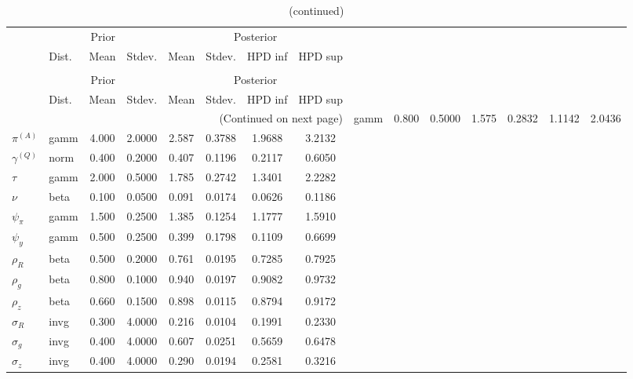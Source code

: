  
\begin{center}
\begin{longtable}{llcccccc} 
\caption{Results from Metropolis-Hastings (parameters)}
 \label{Table:MHPosterior:1}\\
\toprule 
  & \multicolumn{3}{c}{Prior}  &  \multicolumn{4}{c}{Posterior} \\
  \cmidrule(r{.75em}){2-4} \cmidrule(r{.75em}){5-8}
  & Dist. & Mean  & Stdev. & Mean & Stdev. & HPD inf & HPD sup\\
\midrule \endfirsthead 
\caption{(continued)}\\\toprule 
  & \multicolumn{3}{c}{Prior}  &  \multicolumn{4}{c}{Posterior} \\
  \cmidrule(r{.75em}){2-4} \cmidrule(r{.75em}){5-8}
  & Dist. & Mean  & Stdev. & Mean & Stdev. & HPD inf & HPD sup\\
\midrule \endhead 
\bottomrule \multicolumn{8}{r}{(Continued on next page)} \endfoot 
\bottomrule \endlastfoot 
${r_{A}}$ & gamm &   0.800 & 0.5000 &   1.575& 0.2832 &  1.1142 &  2.0436 \\ 
${\pi^{(A)}}$ & gamm &   4.000 & 2.0000 &   2.587& 0.3788 &  1.9688 &  3.2132 \\ 
${\gamma^{(Q)}}$ & norm &   0.400 & 0.2000 &   0.407& 0.1196 &  0.2117 &  0.6050 \\ 
${\tau}$ & gamm &   2.000 & 0.5000 &   1.785& 0.2742 &  1.3401 &  2.2282 \\ 
${\nu}$ & beta &   0.100 & 0.0500 &   0.091& 0.0174 &  0.0626 &  0.1186 \\ 
${\psi_\pi}$ & gamm &   1.500 & 0.2500 &   1.385& 0.1254 &  1.1777 &  1.5910 \\ 
${\psi_y}$ & gamm &   0.500 & 0.2500 &   0.399& 0.1798 &  0.1109 &  0.6699 \\ 
${\rho_R}$ & beta &   0.500 & 0.2000 &   0.761& 0.0195 &  0.7285 &  0.7925 \\ 
${\rho_{g}}$ & beta &   0.800 & 0.1000 &   0.940& 0.0197 &  0.9082 &  0.9732 \\ 
${\rho_z}$ & beta &   0.660 & 0.1500 &   0.898& 0.0115 &  0.8794 &  0.9172 \\ 
${\sigma_R}$ & invg &   0.300 & 4.0000 &   0.216& 0.0104 &  0.1991 &  0.2330 \\ 
${\sigma_{g}}$ & invg &   0.400 & 4.0000 &   0.607& 0.0251 &  0.5659 &  0.6478 \\ 
${\sigma_z}$ & invg &   0.400 & 4.0000 &   0.290& 0.0194 &  0.2581 &  0.3216 \\ 
\end{longtable}
 \end{center}

